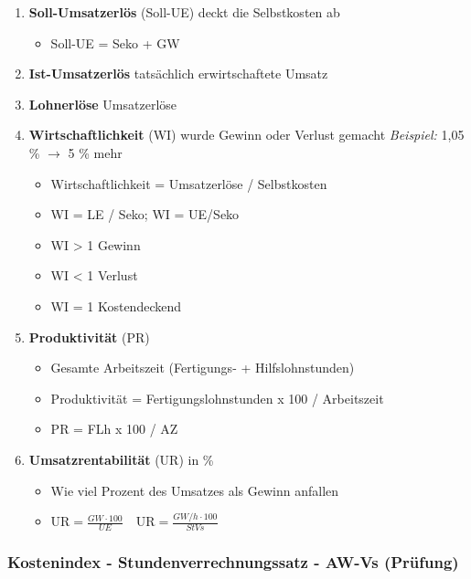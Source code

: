 \begin{enumerate}
\item
  \textbf{Soll-Umsatzerlös} (Soll-UE) deckt die Selbstkosten ab

  \begin{itemize}
  \item
    Soll-UE = Seko + GW
  \end{itemize}
\item
  \textbf{Ist-Umsatzerlös} tatsächlich erwirtschaftete Umsatz
\item
  \textbf{Lohnerlöse} Umsatzerlöse
\item
  \textbf{Wirtschaftlichkeit} (WI) wurde Gewinn oder Verlust gemacht
  \emph{Beispiel:} 1,05 \% $\to$ 5 \% mehr

  \begin{itemize}
  \item
    Wirtschaftlichkeit = Umsatzerlöse / Selbstkosten
  \item
    WI = LE / Seko; WI = UE/Seko
  \item
    WI > 1 Gewinn
  \item
    WI \textless{} 1 Verlust
  \item
    WI = 1 Kostendeckend
  \end{itemize}
\item
  \textbf{Produktivität} (PR)

  \begin{itemize}
  \item
    Gesamte Arbeitszeit (Fertigungs- + Hilfslohnstunden)
  \item
    Produktivität = Fertigungslohnstunden x 100 / Arbeitszeit
  \item
    PR = FLh x 100 / AZ
  \end{itemize}
\item
  \textbf{Umsatzrentabilität} (UR) in \%

  \begin{itemize}
  \item
    Wie viel Prozent des Umsatzes als Gewinn anfallen
  \item
    $\boxed{\text{UR} = \frac{GW \cdot 100}{UE}} \quad \boxed{\text{UR} = \frac{GW/h \cdot 100}{StVs}}$
  \end{itemize}
\end{enumerate}

\newpage

\subsubsection{Kostenindex - Stundenverrechnungssatz - AW-Vs
(Prüfung)}\label{kostenindex-stundenverrechnungssatz-aw-vs-pruefung}


